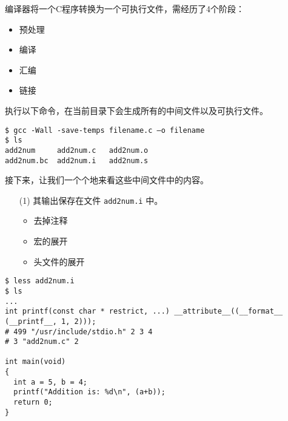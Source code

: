 \begin{frame}[fragile]\ft{\secname}
编译器将一个C程序转换为一个可执行文件，需经历了4个阶段：
\begin{itemize}
\item 预处理\\[.1in]
\item 编译\\[.1in]
\item 汇编\\[.1in]
\item 链接
\end{itemize}
\end{frame}


\begin{frame}[fragile]\ft{\secname}
执行以下命令，在当前目录下会生成所有的中间文件以及可执行文件。
\begin{lstlisting}
$ gcc -Wall -save-temps filename.c –o filename 
$ ls 
add2num     add2num.c   add2num.o
add2num.bc  add2num.i   add2num.s
\end{lstlisting}

接下来，让我们一个个地来看这些中间文件中的内容。 
\end{frame}


\begin{frame}[fragile]\ft{\secname}

\begin{itemize}
\item[(1)]  \quad 其输出保存在文件 \lstinline|add2num.i| 中。\\[.1in]

\begin{itemize}
\item 去掉注释\\[.1in]
\item 宏的展开\\[.1in]
\item 头文件的展开\\[.1in]
\end{itemize}
 
\end{itemize}
\pause 

\begin{lstlisting}
$ less add2num.i
$ ls 
...
int printf(const char * restrict, ...) __attribute__((__format__ (__printf__, 1, 2)));
# 499 "/usr/include/stdio.h" 2 3 4
# 3 "add2num.c" 2

int main(void)
{
  int a = 5, b = 4;
  printf("Addition is: %d\n", (a+b));
  return 0;
}
\end{lstlisting}
\end{frame}


